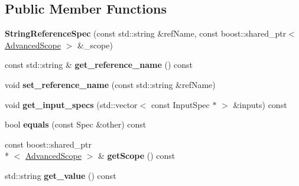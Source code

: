 \subsection*{Public Member Functions}
\begin{DoxyCompactItemize}
\item 
\hypertarget{classgiskard__suturo_1_1StringReferenceSpec_a0ffe13b31aca247d93550ef38ae0dc45}{{\bfseries String\-Reference\-Spec} (const std\-::string \&ref\-Name, const boost\-::shared\-\_\-ptr$<$ \hyperlink{classgiskard__suturo_1_1AdvancedScope}{Advanced\-Scope} $>$ \&\-\_\-scope)}\label{classgiskard__suturo_1_1StringReferenceSpec_a0ffe13b31aca247d93550ef38ae0dc45}

\item 
\hypertarget{classgiskard__suturo_1_1StringReferenceSpec_a668f3ae9705593a495b5c34a2312edbe}{const std\-::string \& {\bfseries get\-\_\-reference\-\_\-name} () const }\label{classgiskard__suturo_1_1StringReferenceSpec_a668f3ae9705593a495b5c34a2312edbe}

\item 
\hypertarget{classgiskard__suturo_1_1StringReferenceSpec_aa0366c522078c2e1b5c1bb34b49ae1cd}{void {\bfseries set\-\_\-reference\-\_\-name} (const std\-::string \&ref\-Name)}\label{classgiskard__suturo_1_1StringReferenceSpec_aa0366c522078c2e1b5c1bb34b49ae1cd}

\item 
\hypertarget{classgiskard__suturo_1_1StringReferenceSpec_aaf53c5cfe15f9af75559a630deeeb243}{void {\bfseries get\-\_\-input\-\_\-specs} (std\-::vector$<$ const Input\-Spec $\ast$ $>$ \&inputs) const }\label{classgiskard__suturo_1_1StringReferenceSpec_aaf53c5cfe15f9af75559a630deeeb243}

\item 
\hypertarget{classgiskard__suturo_1_1StringReferenceSpec_ad12a39d9035a3ef022379811dad3a185}{bool {\bfseries equals} (const Spec \&other) const }\label{classgiskard__suturo_1_1StringReferenceSpec_ad12a39d9035a3ef022379811dad3a185}

\item 
\hypertarget{classgiskard__suturo_1_1StringReferenceSpec_a1352fc3b0b94ba2bd67fb3783368593d}{const boost\-::shared\-\_\-ptr\\*
$<$ \hyperlink{classgiskard__suturo_1_1AdvancedScope}{Advanced\-Scope} $>$ \& {\bfseries get\-Scope} () const }\label{classgiskard__suturo_1_1StringReferenceSpec_a1352fc3b0b94ba2bd67fb3783368593d}

\item 
\hypertarget{classgiskard__suturo_1_1StringReferenceSpec_a0b3dcced6e8bf4316a5e3a99c8b57647}{std\-::string {\bfseries get\-\_\-value} () const }\label{classgiskard__suturo_1_1StringReferenceSpec_a0b3dcced6e8bf4316a5e3a99c8b57647}

\end{DoxyCompactItemize}
